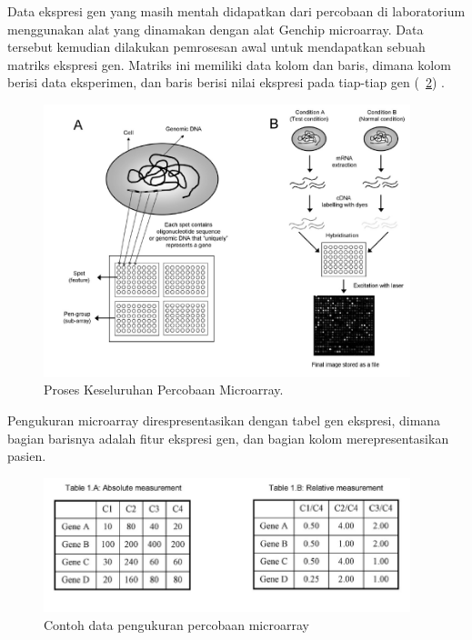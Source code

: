 Data ekspresi gen yang masih mentah didapatkan dari percobaan di laboratorium menggunakan alat yang dinamakan dengan alat Genchip microarray. Data tersebut kemudian dilakukan pemrosesan awal untuk mendapatkan sebuah matriks ekspresi gen. Matriks ini memiliki data kolom dan baris, dimana kolom berisi data eksperimen, dan baris berisi nilai ekspresi pada tiap-tiap gen (\pic~\ref{fig:gbr2.3}) \citep{babu2004introduction}.

\begin{figure}
	\centering
	\includegraphics[width=0.95\textwidth]
		{pics/gbr2_2.png}
	\caption{Proses Keseluruhan Percobaan Microarray.\citep{yoon2006building}}
	\label{fig:gbr2.2}
\end{figure}

Pengukuran microarray direspresentasikan dengan tabel gen ekspresi, dimana bagian barisnya adalah fitur ekspresi gen, dan bagian kolom merepresentasikan pasien.

\begin{figure}
	\centering
	\includegraphics[width=0.95\textwidth]
		{pics/msr.png}
	\caption{Contoh data pengukuran percobaan microarray \citep{yoon2006building}}
	\label{fig:gbr2.3}
\end{figure}

